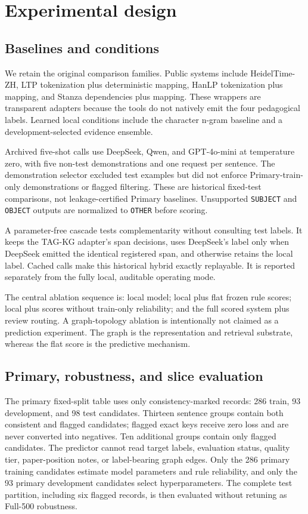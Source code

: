 \documentclass{CUP-JNL-NLP}
\begin{document}
\section{Experimental design}
\subsection{Baselines and conditions}
We retain the original comparison families. Public systems include HeidelTime-ZH, LTP tokenization plus deterministic mapping, HanLP tokenization plus mapping, and Stanza dependencies plus mapping. These wrappers are transparent adapters because the tools do not natively emit the four pedagogical labels. Learned local conditions include the character n-gram baseline and a development-selected evidence ensemble.

Archived five-shot calls use DeepSeek, Qwen, and GPT-4o-mini at temperature zero, with five non-test demonstrations and one request per sentence. The demonstration selector excluded test examples but did not enforce Primary-train-only demonstrations or flagged filtering. These are historical fixed-test comparisons, not leakage-certified Primary baselines. Unsupported \texttt{SUBJECT} and \texttt{OBJECT} outputs are normalized to \texttt{OTHER} before scoring.

A parameter-free cascade tests complementarity without consulting test labels. It keeps the TAG-KG adapter's span decisions, uses DeepSeek's label only when DeepSeek emitted the identical registered span, and otherwise retains the local label. Cached calls make this historical hybrid exactly replayable. It is reported separately from the fully local, auditable operating mode.

The central ablation sequence is: local model; local plus flat frozen rule scores; local plus scores without train-only reliability; and the full scored system plus review routing. A graph-topology ablation is intentionally not claimed as a prediction experiment. The graph is the representation and retrieval substrate, whereas the flat score is the predictive mechanism.

\subsection{Primary, robustness, and slice evaluation}
The primary fixed-split table uses only consistency-marked records: 286 train, 93 development, and 98 test candidates. Thirteen sentence groups contain both consistent and flagged candidates; flagged exact keys receive zero loss and are never converted into negatives. Ten additional groups contain only flagged candidates. The predictor cannot read target labels, evaluation status, quality tier, paper-position notes, or label-bearing graph edges. Only the 286 primary training candidates estimate model parameters and rule reliability, and only the 93 primary development candidates select hyperparameters. The complete test partition, including six flagged records, is then evaluated without retuning as Full-500 robustness.
\end{document}

